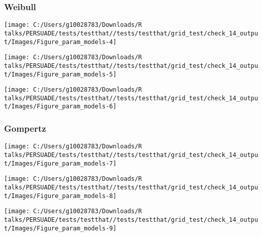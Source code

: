 \documentclass[
]{article}
\begin{document}
\clearpage

\subsubsection{Weibull}\label{weibull}

\begin{flushleft}\texttt{[image: C:/Users/g10028783/Downloads/R talks/PERSUADE/tests/testthat//tests/testthat/grid\_test/check\_14\_output/Images/Figure\_param\_models-4]} \end{flushleft}

\begin{flushleft}\texttt{[image: C:/Users/g10028783/Downloads/R talks/PERSUADE/tests/testthat//tests/testthat/grid\_test/check\_14\_output/Images/Figure\_param\_models-5]} \end{flushleft}

\begin{flushleft}\texttt{[image: C:/Users/g10028783/Downloads/R talks/PERSUADE/tests/testthat//tests/testthat/grid\_test/check\_14\_output/Images/Figure\_param\_models-6]} \end{flushleft}

\clearpage

\subsubsection{Gompertz}\label{gompertz}

\begin{flushleft}\texttt{[image: C:/Users/g10028783/Downloads/R talks/PERSUADE/tests/testthat//tests/testthat/grid\_test/check\_14\_output/Images/Figure\_param\_models-7]} \end{flushleft}

\begin{flushleft}\texttt{[image: C:/Users/g10028783/Downloads/R talks/PERSUADE/tests/testthat//tests/testthat/grid\_test/check\_14\_output/Images/Figure\_param\_models-8]} \end{flushleft}

\begin{flushleft}\texttt{[image: C:/Users/g10028783/Downloads/R talks/PERSUADE/tests/testthat//tests/testthat/grid\_test/check\_14\_output/Images/Figure\_param\_models-9]} \end{flushleft}

\clearpage
\end{document}
